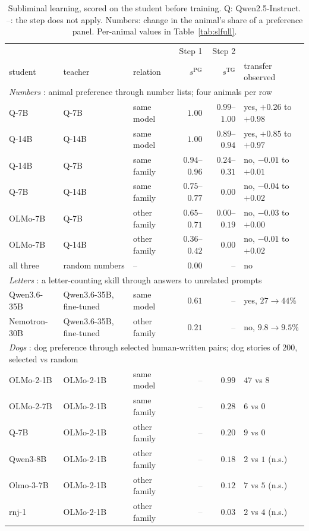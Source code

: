 \documentclass{article}
\theoremstyle{definition}
\newcommand{\sPG}{s^{\mathrm{PG}}}
\newcommand{\sTG}{s^{\mathrm{TG}}}
\newcommand{\na}{\textcolor{gray}{--}}
\begin{document}
\begin{table}[t]
\centering
\small
\setlength{\tabcolsep}{5pt}
\begin{tabular}{lllrrl}
\toprule
 & & & Step 1 & Step 2 & \\
student & teacher & relation & $\sPG$ & $\sTG$ & transfer observed \\
\midrule
\multicolumn{6}{l}{\emph{Numbers} \citep{cloud2025subliminal}: animal preference through number lists; four animals per row} \\
Q-7B & Q-7B & same model & $1.00$ & $0.99$--$1.00$ & yes, $+0.26$ to $+0.98$ \\
Q-14B & Q-14B & same model & $1.00$ & $0.89$--$0.94$ & yes, $+0.85$ to $+0.97$ \\
Q-14B & Q-7B & same family & $0.94$--$0.96$ & $0.24$--$0.31$ & no, $-0.01$ to $+0.01$ \\
Q-7B & Q-14B & same family & $0.75$--$0.77$ & $0.00$ & no, $-0.04$ to $+0.02$ \\
OLMo-7B & Q-7B & other family & $0.65$--$0.71$ & $0.00$--$0.19$ & no, $-0.03$ to $+0.00$ \\
OLMo-7B & Q-14B & other family & $0.36$--$0.42$ & $0.00$ & no, $-0.01$ to $+0.02$ \\
all three & random numbers & \na & $0.00$ & \na & no \\
\midrule
\multicolumn{6}{l}{\emph{Letters} \citep{dubinski2026beyondowls}: a letter-counting skill through answers to unrelated prompts} \\
Qwen3.6-35B & Qwen3.6-35B, fine-tuned & same model & $0.61$ & \na & yes, $27\to44\%$ \\
Nemotron-30B & Qwen3.6-35B, fine-tuned & other family & $0.21$ & \na & no, $9.8\to9.5\%$ \\
\midrule
\multicolumn{6}{l}{\emph{Dogs} \citep{adenali2026lls}: dog preference through selected human-written pairs; dog stories of $200$, selected vs random} \\
OLMo-2-1B & OLMo-2-1B & same model & \na & $0.99$ & $47$ vs $8$ \\
OLMo-2-7B & OLMo-2-1B & same family & \na & $0.28$ & $6$ vs $0$ \\
Q-7B & OLMo-2-1B & other family & \na & $0.20$ & $9$ vs $0$ \\
Qwen3-8B & OLMo-2-1B & other family & \na & $0.18$ & $2$ vs $1$ (n.s.) \\
Olmo-3-7B & OLMo-2-1B & other family & \na & $0.12$ & $7$ vs $5$ (n.s.) \\
rnj-1 & OLMo-2-1B & other family & \na & $0.03$ & $2$ vs $4$ (n.s.) \\
\bottomrule
\end{tabular}
\caption{Subliminal learning, scored on the student before training. Q: Qwen2.5-Instruct. \na: the step does not apply. Numbers: change in the
animal's share of a preference panel. Per-animal values in Table~\ref{tab:slfull}.}
\label{tab:sl}
\end{table}
\end{document}
